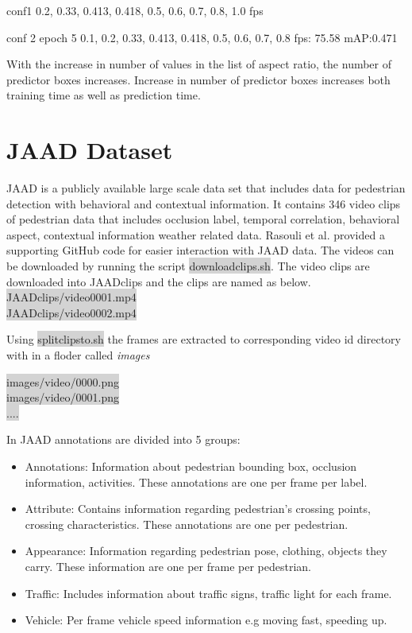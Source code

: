 conf1
0.2, 0.33, 0.413, 0.418, 0.5, 0.6, 0.7, 0.8, 1.0
fps 

conf 2
epoch 5
0.1, 0.2, 0.33, 0.413, 0.418, 0.5, 0.6, 0.7, 0.8
fps: 75.58 
mAP:0.471



With the increase in number of values in the list of aspect ratio, the number of predictor boxes increases. Increase in number of predictor boxes increases both training time as well as prediction time.

\section{JAAD Dataset}

JAAD \cite{rasouli2017agreeing} is a publicly available large scale data set that includes data for pedestrian detection with behavioral and contextual information. It contains 346 video clips of pedestrian data that includes occlusion label, temporal correlation, behavioral aspect, contextual information weather related data. Rasouli et al. provided a supporting GitHub code for easier interaction with JAAD data. The videos can be downloaded by running the script \colorbox{lightgray}{download\textunderscore clips.sh}. The video clips are downloaded into JAAD\textunderscore clips and the clips are named as below.\\
\colorbox{lightgray} {JAAD\textunderscore clips/video\textunderscore  0001.mp4} \\
\colorbox{lightgray} {JAAD\textunderscore clips/video\textunderscore  0002.mp4}

Using \colorbox{lightgray}{split\textunderscore clips\textunderscore to\textunderscore .sh} the frames are extracted to corresponding video id directory with in a floder called \textit{images} \\
\begin{center}
\colorbox{lightgray} {images/video/0000.png} \\
\colorbox{lightgray} {images/video/0001.png} \\
\colorbox{lightgray} {....}
\end{center}

In JAAD annotations are divided into 5 groups:
\begin{itemize}
	\item Annotations: Information about pedestrian bounding box, occlusion information, activities. These annotations are one per frame per label.
	\item Attribute: Contains information regarding pedestrian’s crossing points, crossing characteristics. These annotations are one per pedestrian.
	\item Appearance: Information regarding pedestrian pose, clothing, objects they carry. These information are one per frame per pedestrian.
	\item Traffic: Includes information about traffic signs, traffic light for each frame.
	\item Vehicle: Per frame vehicle speed information e.g moving fast, speeding up.
\end{itemize}


